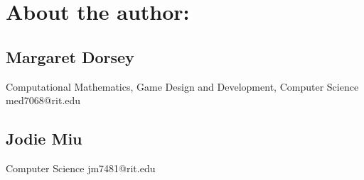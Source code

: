 \documentclass{article}
\begin{document}

\section*{About the author:}



\subsection*{Margaret Dorsey}
   Computational Mathematics, Game Design and Development, Computer Science
   med7068@rit.edu

\subsection*{Jodie Miu}
   Computer Science
   jm7481@rit.edu 
   
   



 

\end{document}
